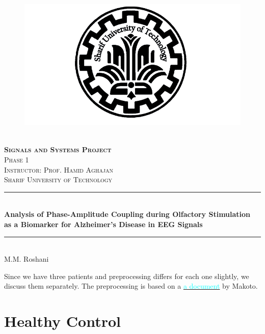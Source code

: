 \documentclass[hidelinks,12pt]{article}
\author{M.M. Roshani}
\begin{document}
	\begin{titlepage}
		\begin{center}
			\begin{figure}
				\vspace{-1.0cm}
				\centering
				\includegraphics[scale=0.35]{SUT_logo}
			\end{figure}
			\mbox{}\\[2.0cm]
			\textsc{\Huge \textbf{Signals and Systems Project}}\\[1.0cm]
			\textsc{\LARGE Phase 1}\\[1.5cm]
			\textsc{\LARGE Instructor: Prof. Hamid Aghajan}\\[1cm]
			\textsc{\LARGE Sharif University of Technology}\\[1.0cm]
			\rule{\linewidth}{0.5mm} \\
			{\large \bf {\selectfont Analysis of Phase-Amplitude Coupling during Olfactory Stimulation \\ \medskip as a Biomarker for Alzheimer's Disease in EEG Signals}}\\[0.2cm]
			\rule{\linewidth}{0.5mm} \\
			\vfill
			{\Large M.M. Roshani}
		\end{center}
	\end{titlepage}
	
	\tableofcontents
	\newpage
	
	
	Since we have three patients and preprocessing differs for each one slightly, we discuss them separately. The preprocessing is based on a \href{https://sccn.ucsd.edu/wiki/Makoto's_preprocessing_pipeline#Further_optimizing_the_preprocessing_order.3F_.2802.2F28.2F2020_updated.29}{\textcolor{Cyan}{a document}} by Makoto.
	
	\section{Healthy Control}
\end{document}
